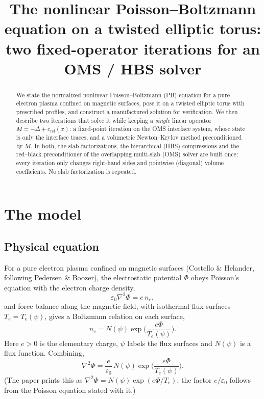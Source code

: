 \documentclass[11pt,a4paper]{article}
\title{The nonlinear Poisson--Boltzmann equation on a twisted elliptic torus:\\
two fixed-operator iterations for an OMS / HBS solver}
\author{}
\date{}
\theoremstyle{remark}\newtheorem{remark}{Remark}
\newcommand{\cR}{c_{\mathrm{ref}}}
\begin{document}
\maketitle

\begin{abstract}
We state the normalized nonlinear Poisson--Boltzmann (PB) equation for a pure
electron plasma confined on magnetic surfaces, pose it on a twisted elliptic
torus with prescribed profiles, and construct a manufactured solution for
verification. We then describe two iterations that solve it while keeping a
\emph{single} linear operator $M=-\Delta+\cR(x)$: a fixed-point
iteration on the OMS interface system, whose state is only the interface
traces, and a volumetric Newton--Krylov method preconditioned by $M$. In both, the
slab factorizations, the hierarchical (HBS) compressions and the red--black
preconditioner of the overlapping multi-slab (OMS) solver are built once; every
iteration only changes right-hand sides and pointwise (diagonal) volume
coefficients. No slab factorization is repeated.
\end{abstract}

\tableofcontents

\section{The model}

\subsection{Physical equation}
For a pure electron plasma confined on magnetic surfaces (Costello \& Helander,
following Pedersen \& Boozer), the electrostatic potential $\Phi$ obeys
Poisson's equation with the electron charge density,
\begin{equation}
  \varepsilon_0\nabla^2\Phi = e\,n_e ,
\end{equation}
and force balance along the magnetic field, with isothermal flux surfaces
$T_e=T_e(\psi)$, gives a Boltzmann relation on each surface,
\begin{equation}
  n_e = N(\psi)\exp\!\Big(\frac{e\Phi}{T_e(\psi)}\Big).
\end{equation}
Here $e>0$ is the elementary charge, $\psi$ labels the flux surfaces and
$N(\psi)$ is a flux function. Combining,
\begin{equation}\label{eq:pb-dim}
  \nabla^2\Phi = \frac{e}{\varepsilon_0}\,N(\psi)\exp\!\Big(\frac{e\Phi}{T_e(\psi)}\Big).
\end{equation}
(The paper prints this as $\nabla^2\Phi=N(\psi)\exp(e\Phi/T_e)$; the factor
$e/\varepsilon_0$ follows from the Poisson equation stated with it.)
\end{document}
